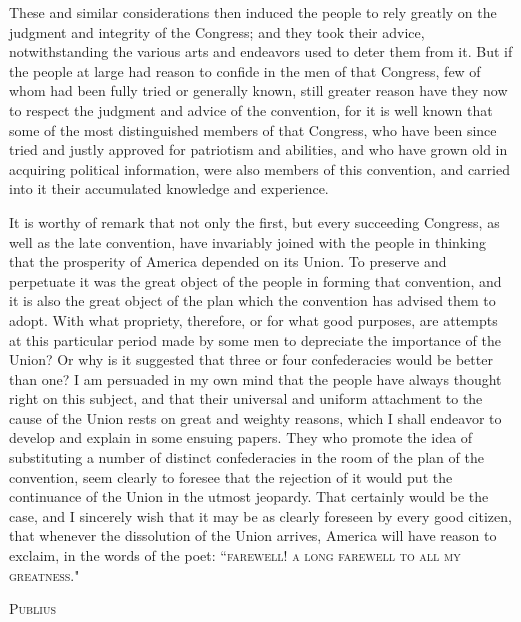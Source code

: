 These and similar considerations then induced the people to rely greatly on the judgment and integrity of the Congress; and they took their advice, notwithstanding the various arts and endeavors used to deter them from it. But if the people at large had reason to confide in the men of that Congress, few of whom had been fully tried or generally known, still greater reason have they now to respect the judgment and advice of the convention, for it is well known that some of the most distinguished members of that Congress, who have been since tried and justly approved for patriotism and abilities, and who have grown old in acquiring political information, were also members of this convention, and carried into it their accumulated knowledge and experience.

It is worthy of remark that not only the first, but every succeeding Congress, as well as the late convention, have invariably joined with the people in thinking that the prosperity of America depended on its Union. To preserve and perpetuate it was the great object of the people in forming that convention, and it is also the great object of the plan which the convention has advised them to adopt. With what propriety, therefore, or for what good purposes, are attempts at this particular period made by some men to depreciate the importance of the Union? Or why is it suggested that three or four confederacies would be better than one? I am persuaded in my own mind that the people have always thought right on this subject, and that their universal and uniform attachment to the cause of the Union rests on great and weighty reasons, which I shall endeavor to develop and explain in some ensuing papers. They who promote the idea of substituting a number of distinct confederacies in the room of the plan of the convention, seem clearly to foresee that the rejection of it would put the continuance of the Union in the utmost jeopardy. That certainly would be the case, and I sincerely wish that it may be as clearly foreseen by every good citizen, that whenever the dissolution of the Union arrives, America will have reason to exclaim, in the words of the poet: ``\textsc{farewell}! \textsc{a long farewell to all my greatness}."

\vspace{.5cm}
\textsc{Publius}

\vspace{1.5cm}

